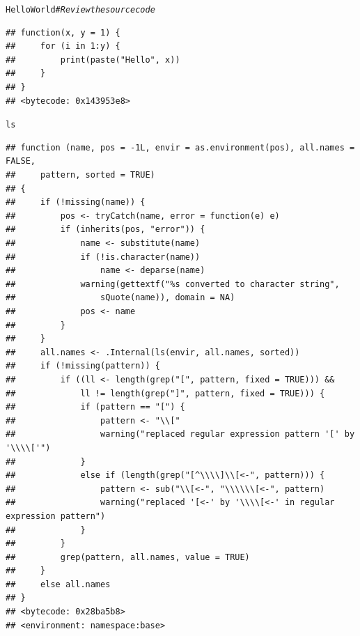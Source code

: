 \documentclass{beamer}\usepackage[]{graphicx}\usepackage[]{color}
\makeatletter
\newcommand{\hlcom}[1]{\textcolor[rgb]{0.678,0.584,0.686}{\textit{#1}}}%
\newcommand{\hlstd}[1]{\textcolor[rgb]{0.345,0.345,0.345}{#1}}%
\newenvironment{kframe}{%
 \def\at@end@of@kframe{}%
 \ifinner\ifhmode%
  \def\at@end@of@kframe{\end{minipage}}%
  \begin{minipage}{\columnwidth}%
 \fi\fi%
 \def\FrameCommand##1{\hskip\@totalleftmargin \hskip-\fboxsep
 \colorbox{shadecolor}{##1}\hskip-\fboxsep
     \hskip-\linewidth \hskip-\@totalleftmargin \hskip\columnwidth}%
 \MakeFramed {\advance\hsize-\width
   \@totalleftmargin\z@ \linewidth\hsize
   \@setminipage}}%
 {\par\unskip\endMakeFramed%
 \at@end@of@kframe}
\newenvironment{knitrout}{}{} %
\makeatother
\begin{document}
\begin{frame}
\begin{knitrout}\scriptsize
{}\color{fgcolor}\begin{kframe}
\begin{alltt}
\hlstd{HelloWorld}  \hlcom{# Review the source code}
\end{alltt}
\begin{verbatim}
## function(x, y = 1) {
##     for (i in 1:y) {
##         print(paste("Hello", x))
##     }
## }
## <bytecode: 0x143953e8>
\end{verbatim}
\begin{alltt}
\hlstd{ls}
\end{alltt}
\begin{verbatim}
## function (name, pos = -1L, envir = as.environment(pos), all.names = FALSE, 
##     pattern, sorted = TRUE) 
## {
##     if (!missing(name)) {
##         pos <- tryCatch(name, error = function(e) e)
##         if (inherits(pos, "error")) {
##             name <- substitute(name)
##             if (!is.character(name)) 
##                 name <- deparse(name)
##             warning(gettextf("%s converted to character string", 
##                 sQuote(name)), domain = NA)
##             pos <- name
##         }
##     }
##     all.names <- .Internal(ls(envir, all.names, sorted))
##     if (!missing(pattern)) {
##         if ((ll <- length(grep("[", pattern, fixed = TRUE))) && 
##             ll != length(grep("]", pattern, fixed = TRUE))) {
##             if (pattern == "[") {
##                 pattern <- "\\["
##                 warning("replaced regular expression pattern '[' by  '\\\\['")
##             }
##             else if (length(grep("[^\\\\]\\[<-", pattern))) {
##                 pattern <- sub("\\[<-", "\\\\\\[<-", pattern)
##                 warning("replaced '[<-' by '\\\\[<-' in regular expression pattern")
##             }
##         }
##         grep(pattern, all.names, value = TRUE)
##     }
##     else all.names
## }
## <bytecode: 0x28ba5b8>
## <environment: namespace:base>
\end{verbatim}
\end{kframe}
\end{knitrout}
\end{frame}
\end{document}
